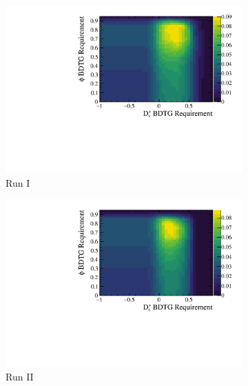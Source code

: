 \begin{figure}[!h]
\begin{subfigure}[t]{0.4\textwidth}
      \centering
      \includegraphics[width=1.0\textwidth]{figs/Selection/Ds2PiPiPi_BDTG_punzi_Run1_cont.pdf}
      \caption{Run I \decay{\Dsp}{\pip\pim\pip}}
   \end{subfigure}
   \begin{subfigure}[t]{0.4\textwidth}
      \centering
      \includegraphics[width=1.0\textwidth]{figs/Selection/Ds2PiPiPi_BDTG_punzi_Run2_cont.pdf}
      \caption{Run II \decay{\Dsp}{\pip\pim\pip}}
   \end{subfigure}\\
   \begin{subfigure}[t]{0.4\textwidth}
      \centering

\end{subfigure}
\end{figure}
